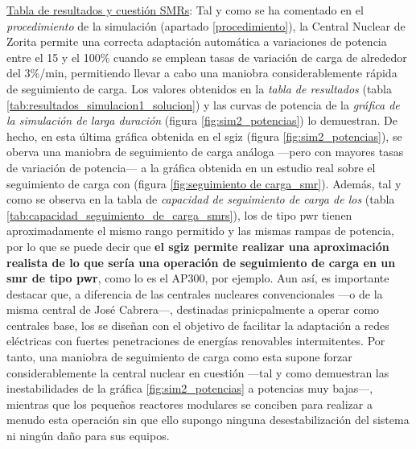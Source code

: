 \underline{Tabla de resultados y cuestión SMRs}: Tal y como se ha comentado en el \textit{procedimiento} de la simulación (apartado \ref{procedimiento}), la Central Nuclear de Zorita permite una correcta adaptación automática a variaciones de potencia entre el 15 y el 100\% cuando se emplean tasas de variación de carga de alrededor del 3\%/min, permitiendo llevar a cabo una maniobra considerablemente rápida de seguimiento de carga. Los valores obtenidos en la \textit{tabla de resultados} (tabla \ref{tab:resultados_simulacion1_solucion}) y las curvas de potencia de la \textit{gráfica de la simulación de larga duración} (figura \ref{fig:sim2_potencias}) lo demuestran. De hecho, en esta última gráfica obtenida en el \acrshort{sgiz} (figura \ref{fig:sim2_potencias}), se oberva una maniobra de seguimiento de carga análoga ---pero con mayores tasas de variación de potencia--- a la gráfica obtenida en un estudio real sobre el seguimiento de carga con  (figura \ref{fig:seguimiento de carga_smr}). Además, tal y como se observa en la tabla de \textit{capacidad de seguimiento de carga de los } (tabla \ref{tab:capacidad_seguimiento_de_carga_smrs}), los  de tipo \acrshort{pwr} tienen aproximadamente el mismo rango permitido y las mismas rampas de potencia, por lo que se puede decir que \textbf{el \acrshort{sgiz} permite realizar una aproximación realista de lo que sería una operación de seguimiento de carga en un \acrshort{smr} de tipo \acrshort{pwr}}, como lo es el AP300, por ejemplo. Aun así, es importante destacar que, a diferencia de las centrales nucleares convencionales ---o de la misma central de José Cabrera---, destinadas prinicpalmente a operar como centrales base, los  se diseñan con el objetivo de facilitar la adaptación a redes eléctricas con fuertes penetraciones de energías renovables intermitentes. Por tanto, una maniobra de seguimiento de carga como esta supone forzar considerablemente la central nuclear en cuestión ---tal y como demuestran las inestabilidades de la gráfica \ref{fig:sim2_potencias} a potencias muy bajas---, mientras que los pequeños reactores modulares se conciben para realizar a menudo esta operación sin que ello supongo ninguna desestabilización del sistema ni ningún daño para sus equipos.

